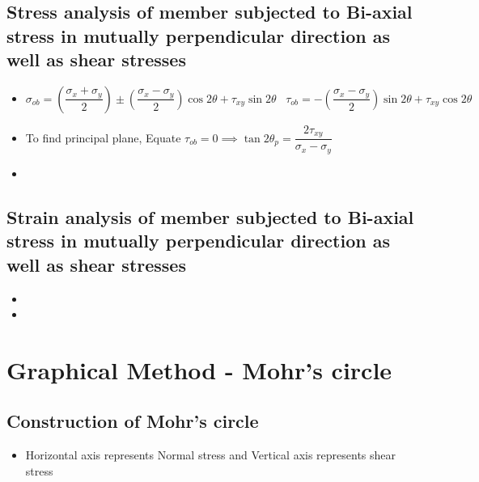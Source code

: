 \documentclass[8pt]{report}
\begin{document}
	\subsection{Stress analysis of member subjected to Bi-axial stress in mutually perpendicular direction as well as shear stresses}
		\begin{itemize}
			\item $\boxed{\sigma_{ob} = \left(\dfrac{\sigma_x+\sigma_y}{2}\right)\pm \left(\dfrac{\sigma_x-\sigma_y}{2}\right)\cos 2\theta+\tau_{xy}\sin 2\theta}\;\;\;\boxed{\tau_{ob} = -\left(\dfrac{\sigma_x-\sigma_y}{2}\right)\sin 2\theta+\tau_{xy}\cos 2\theta}$
			\item To find principal plane, Equate $\tau_{ob} = 0 \implies \boxed{\tan 2\theta_p = \dfrac{2\tau_{xy}}{\sigma_x-\sigma_y}}$
			\item {}
		\end{itemize}\hrulefill
	\subsection{Strain analysis of member subjected to Bi-axial stress in mutually perpendicular direction as well as shear stresses}
		\begin{itemize}
			\item {}
			\item {}
		\end{itemize}\hrulefill
	\section{Graphical Method - Mohr's circle}
		\subsection{Construction of Mohr's circle}
			\begin{itemize}
				\item Horizontal axis represents Normal stress and Vertical axis represents shear stress
			\end{itemize}\hrulefill
\end{document}
